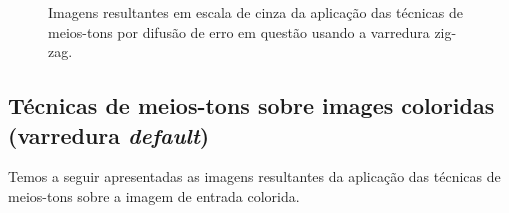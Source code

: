 \documentclass{article}
\begin{document}
\begin{figure}[!htp]
	\qquad
	\quad
	
	\caption{Imagens resultantes em escala de cinza da aplicação das técnicas de meios-tons por difusão de erro em questão usando a varredura zig-zag.}%
	\label{fig:imagem:plano:baboon:cinza:2}%
\end{figure}	

%
\subsection{Técnicas de meios-tons sobre images coloridas (varredura \textit{default})}
Temos a seguir apresentadas as imagens resultantes da aplicação das técnicas de meios-tons sobre a imagem de entrada colorida.
\end{document}
